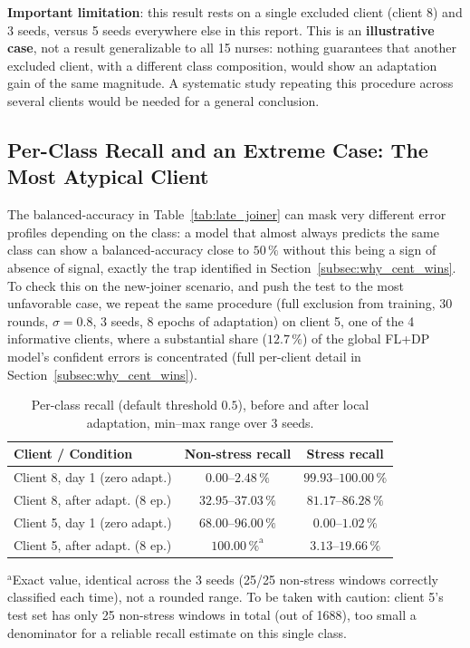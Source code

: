 \documentclass{article}
\begin{document}
\textbf{Important limitation}: this result rests on a single excluded client
(client 8) and 3 seeds, versus 5 seeds everywhere else in this report. This is an
\textbf{illustrative case}, not a result generalizable to all 15 nurses: nothing
guarantees that another excluded client, with a different class composition,
would show an adaptation gain of the same magnitude. A systematic study repeating
this procedure across several clients would be needed for a general conclusion.

\subsection{Per-Class Recall and an Extreme Case: The Most Atypical Client}
\label{subsec:late_joiner_recall}

The balanced-accuracy in Table~\ref{tab:late_joiner} can mask very different error
profiles depending on the class: a model that almost always predicts the same
class can show a balanced-accuracy close to $50\,\%$ without this being a sign of
absence of signal, exactly the trap identified in
Section~\ref{subsec:why_cent_wins}. To check this on the new-joiner scenario, and
push the test to the most unfavorable case, we repeat the same procedure (full
exclusion from training, 30 rounds, $\sigma=0.8$, 3 seeds, 8 epochs of adaptation)
on client 5, one of the 4 informative clients, where a substantial share
($12.7\,\%$) of the global FL+DP model's confident errors is concentrated (full
per-client detail in Section~\ref{subsec:why_cent_wins}).

\begin{table}[h!]
  \centering
  \caption{Per-class recall (default threshold $0.5$), before and after local
  adaptation, min--max range over 3 seeds.}
  \label{tab:late_joiner_recall}
  \begin{tabular}{lcc}
    \toprule
    Client / Condition & Non-stress recall & Stress recall \\
    \midrule
    Client 8, day 1 (zero adapt.)      & $0.00$--$2.48\,\%$   & $99.93$--$100.00\,\%$ \\
    Client 8, after adapt. (8 ep.)      & $32.95$--$37.03\,\%$ & $81.17$--$86.28\,\%$ \\
    \addlinespace
    Client 5, day 1 (zero adapt.)      & $68.00$--$96.00\,\%$ & $0.00$--$1.02\,\%$ \\
    Client 5, after adapt. (8 ep.)      & $100.00\,\%^{\text{a}}$ & $3.13$--$19.66\,\%$ \\
    \bottomrule
  \end{tabular}
  \vspace{2pt}
  {\footnotesize $^{\text{a}}$Exact value, identical across the 3 seeds (25/25
  non-stress windows correctly classified each time), not a rounded range. To be
  taken with caution: client 5's test set has only 25 non-stress windows in total
  (out of 1688), too small a denominator for a reliable recall estimate on this
  single class.}
\end{table}
\end{document}
